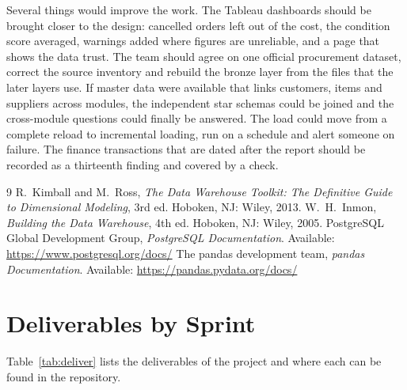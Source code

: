 \documentclass[12pt,a4paper]{report}
\begin{document}
Several things would improve the work. The Tableau dashboards should be brought closer to the design: cancelled orders left out of the cost, the condition score averaged, warnings added where figures are unreliable, and a page that shows the data trust. The team should agree on one official procurement dataset, correct the source inventory and rebuild the bronze layer from the files that the later layers use. If master data were available that links customers, items and suppliers across modules, the independent star schemas could be joined and the cross-module questions could finally be answered. The load could move from a complete reload to incremental loading, run on a schedule and alert someone on failure. The finance transactions that are dated after the report should be recorded as a thirteenth finding and covered by a check.

\begin{thebibliography}{9}
 R.~Kimball and M.~Ross, \emph{The Data Warehouse Toolkit: The Definitive Guide to Dimensional Modeling}, 3rd ed. Hoboken, NJ: Wiley, 2013.
 W.~H.~Inmon, \emph{Building the Data Warehouse}, 4th ed. Hoboken, NJ: Wiley, 2005.
 PostgreSQL Global Development Group, \emph{PostgreSQL Documentation}. Available: \url{https://www.postgresql.org/docs/}
 The pandas development team, \emph{pandas Documentation}. Available: \url{https://pandas.pydata.org/docs/}
\end{thebibliography}

\appendix
\chapter{Deliverables by Sprint}\label{app:deliver}
Table~\ref{tab:deliver} lists the deliverables of the project and where each can be found in the repository.
\end{document}
